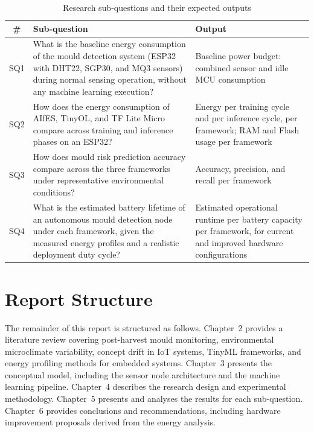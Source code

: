 \begin{table}[htbp]
\centering
\caption{Research sub-questions and their expected outputs}
\label{tab:subquestions}
\begin{tabulary}{\textwidth}{|c|L|L|}
\hline
\textbf{\#} & \textbf{Sub-question} & \textbf{Output} \\
\hline
SQ1 & What is the baseline energy consumption of the mould detection system (ESP32 with DHT22, SGP30, and MQ3 sensors) during normal sensing operation, without any machine learning execution? & Baseline power budget: combined sensor and idle MCU consumption \\
\hline
SQ2 & How does the energy consumption of AIfES, TinyOL, and TF Lite Micro compare across training and inference phases on an ESP32? & Energy per training cycle and per inference cycle, per framework; RAM and Flash usage per framework \\
\hline
SQ3 & How does mould risk prediction accuracy compare across the three frameworks under representative environmental conditions? & Accuracy, precision, and recall per framework \\
\hline
SQ4 & What is the estimated battery lifetime of an autonomous mould detection node under each framework, given the measured energy profiles and a realistic deployment duty cycle? & Estimated operational runtime per battery capacity per framework, for current and improved hardware configurations \\
\hline
\end{tabulary}
\end{table}

\section{Report Structure}

The remainder of this report is structured as follows. Chapter~2 provides a literature review covering post-harvest mould monitoring, environmental microclimate variability, concept drift in IoT systems, TinyML frameworks, and energy profiling methods for embedded systems. Chapter~3 presents the conceptual model, including the sensor node architecture and the machine learning pipeline. Chapter~4 describes the research design and experimental methodology. Chapter~5 presents and analyses the results for each sub-question. Chapter~6 provides conclusions and recommendations, including hardware improvement proposals derived from the energy analysis.
